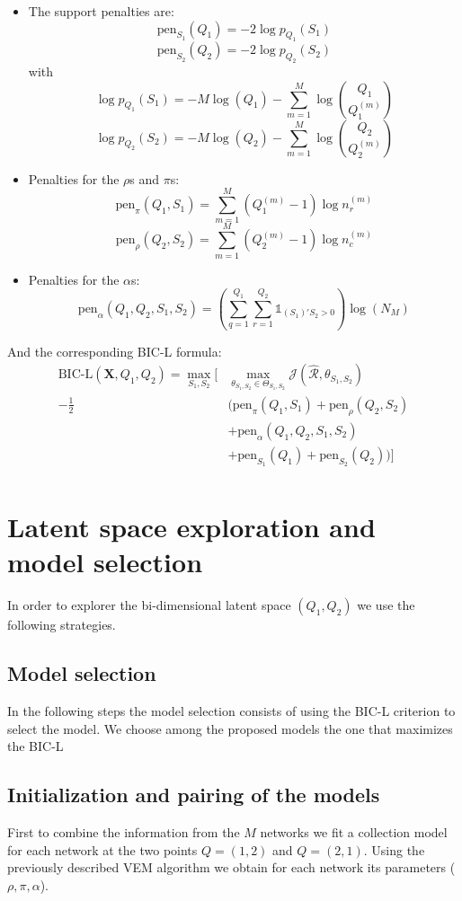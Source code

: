 \documentclass[12pt,a4paper]{report}
\begin{document}
\begin{itemize}
    \item The support penalties are:
    \[ \text{pen}_{S_1}(Q_1) = -2 \log p_{Q_1} (S_1) \]
    \[ \text{pen}_{S_2}(Q_2) = -2 \log p_{Q_2} (S_2) \]
    with
    \[ \log p_{Q_1}(S_1) = - M \log(Q_1) - \sum_{m=1}^{M} \log {Q_1 \choose Q_1^{(m)}} \]
    \[ \log p_{Q_2}(S_2) = - M \log(Q_2) - \sum_{m=1}^{M} \log {Q_2 \choose Q_2^{(m)}} \]
    \item Penalties for the $\rho$s and $\pi$s:
    \[ \text{pen}_{\pi}(Q_1, S_1) = \sum_{m=1}^{M} (Q_{1}^{(m)} - 1) \log n_{r}^{(m)} \]
    \[ \text{pen}_{\rho}(Q_2, S_2) = \sum_{m=1}^{M} (Q_{2}^{(m)} - 1) \log n_{c}^{(m)} \]
    \item Penalties for the $\alpha$s:
    \[ \text{pen}_{\alpha}(Q_1, Q_2, S_1, S_2) = (\sum_{q=1}^{Q_1} \sum_{r=1}^{Q_2} \mathbb{1}_{(S_1)'S_2 > 0}) \log (N_M) \]
\end{itemize}
And the corresponding BIC-L formula:
\[
    \begin{aligned}
        \text{BIC-L}(\bm{X},Q_1, Q_2) = 
        \max_{S_1,S_2} [
            & \max_{\theta_{S_1,S_2} \in \Theta_{S_1,S_2}} \mathcal{J}(\mathcal{\hat{R}},\theta_{S_1,S_2})\\
            - \frac{1}{2} & (\text{pen}_{\pi}(Q_1, S_1)  + \text{pen}_{\rho}(Q_2, S_2)\\
            &+ \text{pen}_{\alpha}(Q_1, Q_2, S_1, S_2)\\
            &+ \text{pen}_{S_1}(Q_1) + \text{pen}_{S_2}(Q_2))]\\
    \end{aligned}
\]

\section{Latent space exploration and model selection}
In order to explorer the bi-dimensional latent space $(Q_1,Q_2)$
we use the following strategies.

\subsection{Model selection}
In the following steps the model selection consists of using the BIC-L 
criterion to select the model. We choose among the proposed models the one that
maximizes the BIC-L

\subsection{Initialization and pairing of the models}
First to combine the information from the $M$ networks we fit a collection model
for each network at the two points $Q = (1, 2)$ and $Q = (2, 1)$. Using the 
previously described VEM algorithm we obtain for each network its parameters 
($\rho,\pi,\alpha$).
\end{document}
